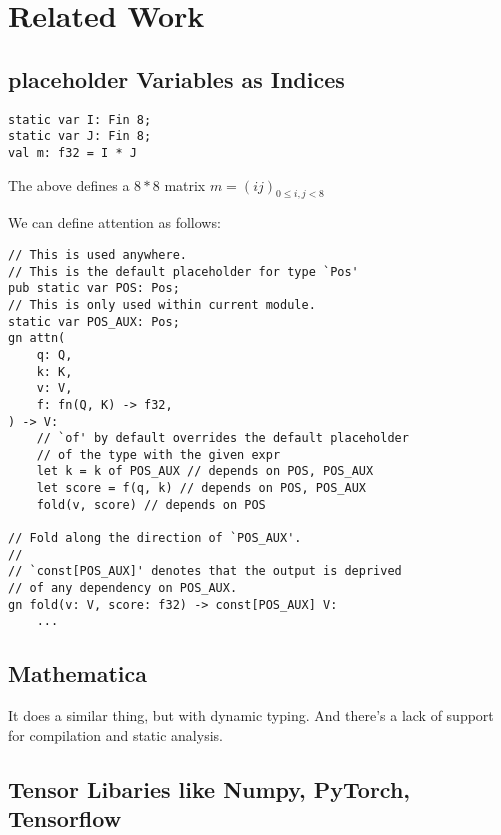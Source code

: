 \documentclass{article}
\begin{document}
\section{Related Work}
\subsection{placeholder Variables as Indices}

\begin{tcolorbox}[colback=gray!5,colframe=gray!50!black,title=Husky Code]
    \begin{lstlisting}[language=Husky]
static var I: Fin 8;
static var J: Fin 8;
val m: f32 = I * J
\end{lstlisting}
\end{tcolorbox}

The above defines a $8*8$ matrix $m=(ij)_{0\le i,j<8}$

We can define attention as follows:

\begin{tcolorbox}[colback=gray!5,colframe=gray!50!black,title=Husky Code]
    \begin{lstlisting}[language=Husky]
// This is used anywhere.
// This is the default placeholder for type `Pos'
pub static var POS: Pos;
// This is only used within current module.
static var POS_AUX: Pos;
gn attn(
    q: Q,
    k: K,
    v: V,
    f: fn(Q, K) -> f32,
) -> V:
    // `of' by default overrides the default placeholder
    // of the type with the given expr
    let k = k of POS_AUX // depends on POS, POS_AUX
    let score = f(q, k) // depends on POS, POS_AUX
    fold(v, score) // depends on POS

// Fold along the direction of `POS_AUX'.
//
// `const[POS_AUX]' denotes that the output is deprived
// of any dependency on POS_AUX.
gn fold(v: V, score: f32) -> const[POS_AUX] V:
    ...
\end{lstlisting}
\end{tcolorbox}

\subsection{Mathematica}
It does a similar thing, but with dynamic typing. And there's a lack of support for compilation and static analysis.

\subsection{Tensor Libaries like Numpy, PyTorch, Tensorflow}

\end{document}
